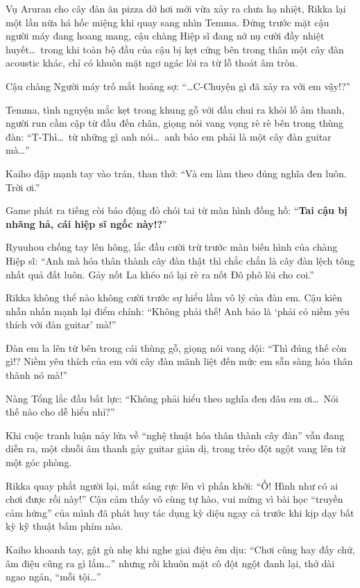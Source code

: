 \documentclass[../main.tex]{subfiles}
\begin{document}
Vụ Aruran cho cây đàn ăn pizza dở hơi mới vừa xảy ra chưa hạ nhiệt, Rikka lại một lần nữa há hốc miệng khi quay sang nhìn Temma. Đứng trước mặt cậu người máy đang hoang mang, cậu chàng Hiệp sĩ đang nở nụ cười đầy nhiệt huyết\dots\ trong khi toàn bộ đầu của cậu bị kẹt cứng bên trong thân một cây đàn acoustic khác, chỉ có khuôn mặt ngơ ngác lòi ra từ lỗ thoát âm tròn.


Cậu chàng Người máy trố mắt hoảng sợ: ``\dots C-Chuyện gì đã xảy ra với em vậy!?''

Temma, tình nguyện mắc kẹt trong khung gỗ với đầu chui ra khỏi lỗ âm thanh, người run cầm cập từ đầu đến chân, giọng nói vang vọng rè rè bên trong thùng đàn: ``T-Thì\dots\ từ những gì anh nói\dots\ anh bảo em phải là một cây đàn guitar mà\dots''

Kaiho đập mạnh tay vào trán, than thở: ``Và em làm theo đúng nghĩa đen luôn. Trời ơi.''

Game phát ra tiếng còi báo động đỏ chói tai từ màn hình đồng hồ: ``\textbf{Tai cậu bị nhãng hả, cái hiệp sĩ ngốc này!?}''

Ryuuhou chống tay lên hông, lắc đầu cười trừ trước màn biến hình của chàng Hiệp sĩ: ``Anh mà hóa thân thành cây đàn thật thì chắc chắn là cây đàn lệch tông nhất quả đất luôn. Gảy nốt La khéo nó lại rè ra nốt Đô phô lòi cho coi.''

Rikka không thể nào không cười trước sự hiểu lầm vô lý của đàn em. Cậu kiên nhẫn nhấn mạnh lại điểm chính: ``Không phải thế! Anh bảo là `phải có niềm yêu thích với đàn guitar' mà!''

Đàn em la lên từ bên trong cái thùng gỗ, giọng nói vang dội: ``Thì đúng thế còn gì!? Niềm yêu thích của em với cây đàn mãnh liệt đến mức em sẵn sàng hóa thân thành nó mà!''

Nàng Tổng lắc đầu bất lực: ``Không phải hiểu theo nghĩa đen đâu em ơi\dots\ Nói thế nào cho dễ hiểu nhỉ?''

Khi cuộc tranh luận nảy lửa về ``nghệ thuật hóa thân thành cây đàn'' vẫn đang diễn ra, một chuỗi âm thanh gảy guitar giản dị, trong trẻo đột ngột vang lên từ một góc phòng.

Rikka quay phắt người lại, mắt sáng rực lên vì phấn khởi: ``Ồ! Hình như có ai chơi được rồi này!'' Cậu cảm thấy vô cùng tự hào, vui mừng vì bài học ``truyền cảm hứng'' của mình đã phát huy tác dụng kỳ diệu ngay cả trước khi kịp dạy bất kỳ kỹ thuật bấm phím nào.

Kaiho khoanh tay, gật gù nhẹ khi nghe giai điệu êm dịu: ``Chơi cũng hay đấy chứ, âm điệu cũng ra gì lắm\dots'' nhưng rồi khuôn mặt cô đột ngột đanh lại, thở dài ngao ngán, ``mỗi tội\dots''
\end{document}
